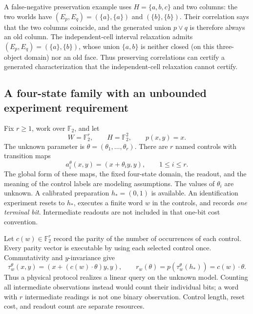 \documentclass[11pt]{article}
\theoremstyle{definition}
\begin{document}
A false-negative preservation example uses $H=\{a,b,c\}$ and two columns: the two worlds have $(E_p,E_q)=(\{a\},\{a\})$ and $(\{b\},\{b\})$. Their correlation says that the two columns coincide, and the generated union $p\vee q$ is therefore always an old column. The independent-cell interval relaxation admits $(E_p,E_q)=(\{a\},\{b\})$, whose union $\{a,b\}$ is neither closed (on this three-object domain) nor an old face. Thus preserving correlations can certify a generated characterization that the independent-cell relaxation cannot certify.


\subsection{A four-state family with an unbounded experiment requirement}
\label{subsec:er-parity}

Fix $r\ge1$, work over $\mathbb F_2$, and let
\[
 W=\mathbb F_2^r,\qquad H=\mathbb F_2^2,\qquad p(x,y)=x.
\]
The unknown parameter is $\theta=(\theta_1,\ldots,\theta_r)$. There are
$r$ named controls with transition maps
\[
 a_i^\theta(x,y)=(x+\theta_i y,y),\qquad 1\le i\le r.
\]
The global form of these maps, the fixed four-state domain, the readout, and
the meaning of the control labels are modeling assumptions. The values of
$\theta_i$ are unknown. A calibrated preparation $h_*=(0,1)$ is available.
An identification experiment resets to $h_*$, executes a finite word $w$
in the controls, and records \emph{one terminal bit}. Intermediate readouts
are not included in that one-bit cost convention.

Let $c(w)\in\mathbb F_2^r$ record the parity of the number of occurrences
of each control. Every parity vector is executable by using each selected
control once. Commutativity and $y$-invariance give
\begin{equation}
 \tau_w^\theta(x,y)=(x+(c(w)\cdot\theta)y,y),
 \qquad
 r_w(\theta)=p(\tau_w^\theta(h_*))=c(w)\cdot\theta.
 \label{eq:er-parity}
\end{equation}
Thus a physical protocol realizes a linear query on the unknown model.
Counting all intermediate observations instead would count their individual
bits; a word with $r$ intermediate readings is not one binary observation.
Control length, reset cost, and readout count are separate resources.
\end{document}
